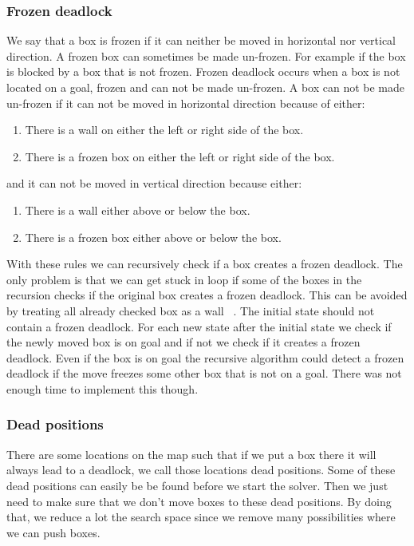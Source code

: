 \documentclass[a4paper,10pt]{article}
\begin{document}
	  \subsubsection{Frozen deadlock}
	    We say that a box is frozen if it can neither be moved in horizontal nor vertical direction.  
	    A frozen box can sometimes be made un-frozen.  For example if the box is blocked by a box that is not frozen.  
	    Frozen deadlock occurs when a box is not located on a goal, frozen and can not be made un-frozen.  
	    A box can not be made un-frozen if it can not be moved in horizontal direction because of either:
	
	    \begin{enumerate}[I]
                \item There is a wall on either the left or right side of the box.
                \item There is a frozen box on either the left or right side of the box.
            \end{enumerate}
            and it can not be moved in vertical direction because either: 
            \begin{enumerate}[I]
                \item There is a wall either above or below the box.
                \item There is a frozen box either above or below the box.
            \end{enumerate}
            With these rules we can recursively check if a box creates a frozen deadlock.  
            The only problem is that we can get stuck in loop if some of the boxes in the recursion checks if the original box creates a frozen deadlock.  
            This can be avoided by treating all already checked box as a wall ~\cite{frozen_deadlock}.    
            The initial state should not contain a frozen deadlock.  
            For each new state after the initial state we check if the newly moved box is on goal and if not we check if it creates a frozen deadlock. 
            Even if the box is on goal the recursive algorithm could detect a frozen deadlock if the move freezes some other box that is not on a goal.  
            There was not enough time to implement this though.
          \subsubsection{Dead positions}
            There are some locations on the map such that if we put a box there it will always lead to a deadlock, we call those locations dead positions.  
            Some of these dead positions can easily be be found before we start the solver. 
            Then we just need to make sure that we don’t move boxes to these dead positions. 
            By doing that, we reduce a lot the search space since we remove many possibilities where we can push boxes.
            
\end{document}
